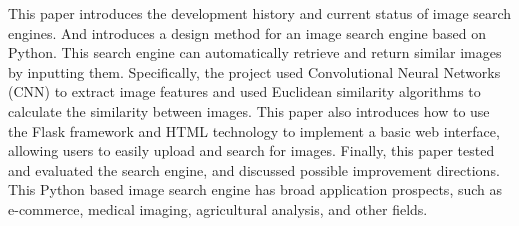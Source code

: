 
\enabstract

This paper introduces the development history and current status of image search engines. And introduces a design method for an image search engine based on Python. This search engine can automatically retrieve and return similar images by inputting them.
Specifically, the project used Convolutional Neural Networks (CNN) to extract image features and used Euclidean similarity algorithms to calculate the similarity between images. This paper also introduces how to use the Flask framework and HTML technology to implement a basic web interface, allowing users to easily upload and search for images. Finally, this paper tested and evaluated the search engine, and discussed possible improvement directions. This Python based image search engine has broad application prospects, such as e-commerce, medical imaging, agricultural analysis, and other fields.

	

